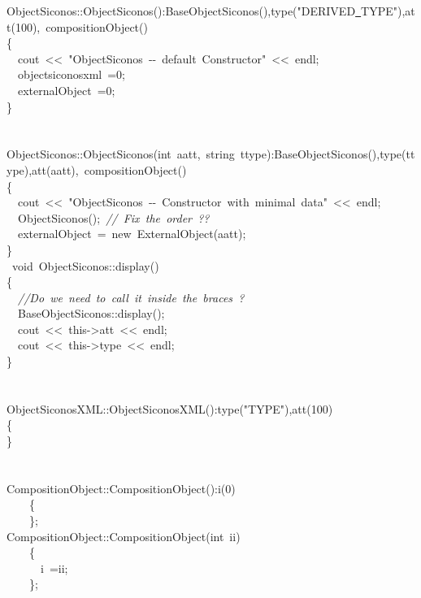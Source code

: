 {\ttfamily \raggedright \small
ObjectSiconos::ObjectSiconos():BaseObjectSiconos(),type("{}DERIVED\underline\ TYPE"{}),att(100),\ compositionObject()\\
\{\\
\ \ cout\ <{}<{}\ "{}ObjectSiconos\ -{}-{}\ default\ Constructor"{}\ <{}<{}\ endl;\\
\ \ objectsiconosxml\ =0;\\
\ \ externalObject\ =0;\\
\}\\
\ \\
\ \\
ObjectSiconos::ObjectSiconos(int\ aatt,\ string\ ttype):BaseObjectSiconos(),type(ttype),att(aatt),\ compositionObject()\\
\{\\
\ \ cout\ <{}<{}\ "{}ObjectSiconos\ -{}-{}\ Constructor\ with\ minimal\ data"{}\ <{}<{}\ endl;\\
\ \ ObjectSiconos();\ \textsl{//\ Fix\ the\ order\ ??}\\
\ \ externalObject\ =\ new\ ExternalObject(aatt);\\
\}\\
\ void\ ObjectSiconos::display()\\
\{\\
\ \ \textsl{//Do\ we\ need\ to\ call\ it\ inside\ the\ braces\ ?}\\
\ \ BaseObjectSiconos::display();\ \\
\ \ cout\ <{}<{}\ this-{}>{}att\ <{}<{}\ endl;\\
\ \ cout\ <{}<{}\ this-{}>{}type\ <{}<{}\ endl;\\
\}\\
\ \\
\ \\
ObjectSiconosXML::ObjectSiconosXML():type("{}TYPE"{}),att(100)\\
\{\\
\}\\
\ \\
\ \\
CompositionObject::CompositionObject():i(0)\\
\ \ \ \ \{\\
\ \ \ \ \};\\
CompositionObject::CompositionObject(int\ ii)\\
\ \ \ \ \{\\
\ \ \ \ \ \ i\ =ii;\\
\ \ \ \ \};\\
\ \\
}
